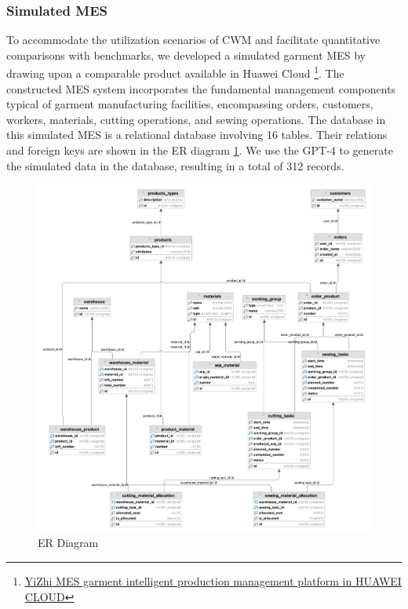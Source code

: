 \documentclass[preprint,12pt]{elsarticle}
\begin{document}
\subsubsection{Simulated MES}
To accommodate the utilization scenarios of CWM and facilitate quantitative comparisons with benchmarks, we developed a simulated garment MES by drawing upon a comparable product available in Huawei Cloud
\footnote{\href{https://marketplace.huaweicloud.com/contents/da115457-cf31-47e1-bcff-965e5469d360\#productid=00301-608119-0--0}{YiZhi MES garment intelligent production management platform in HUAWEI CLOUD}}.
The constructed MES system incorporates the fundamental management components typical of garment manufacturing facilities, encompassing orders, customers, workers, materials, cutting operations, and sewing operations. 
The database in this simulated MES is a relational database involving 16 tables.
Their relations and foreign keys are shown in the ER diagram \ref{fig:er_diagram}.
We use the GPT-4 to generate the simulated data in the database, resulting in a total of 312 records.
\begin{figure}
        \centering
        \includegraphics[width=1.1\linewidth]{figs/garment.png}
        \caption{ER Diagram}
        \label{fig:er_diagram}
\end{figure}
    
\end{document}
